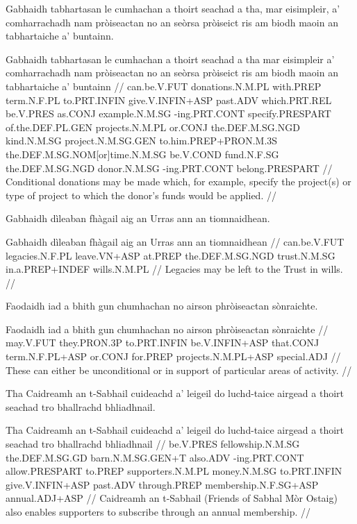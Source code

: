\documentclass[a4paper,10pt]{article}
\begin{document}
\ex
\begingl
\glpre Gabhaidh tabhartasan le cumhachan a thoirt seachad a tha, mar eisimpleir, a' comharrachadh nam pròiseactan no an seòrsa pròiseict ris am biodh maoin an tabhartaiche a' buntainn. 

\vspace{4mm}
\gla Gabhaidh tabhartasan le cumhachan a thoirt seachad a tha mar eisimpleir a' comharrachadh nam pròiseactan no an seòrsa pròiseict ris am biodh maoin an tabhartaiche a' buntainn  //
\glb can.be.V.FUT donations.N.M.PL with.PREP term.N.F.PL to.PRT.INFIN give.V.INFIN+ASP past.ADV which.PRT.REL be.V.PRES as.CONJ example.N.M.SG -ing.PRT.CONT specify.PRESPART of.the.DEF.PL.GEN projects.N.M.PL or.CONJ the.DEF.M.SG.NGD kind.N.M.SG project.N.M.SG.GEN to.him.PREP+PRON.M.3S the.DEF.M.SG.NOM[or]time.N.M.SG be.V.COND fund.N.F.SG the.DEF.M.SG.NGD donor.N.M.SG -ing.PRT.CONT belong.PRESPART  //
\glft Conditional donations may be made which, for example, specify the project(s) or type of project to which the donor's funds would be applied. //
\endgl
\xe

\ex
\begingl
\glpre Gabhaidh dìleaban fhàgail aig an Urras ann an tiomnaidhean. 

\vspace{4mm}
\gla Gabhaidh dìleaban fhàgail aig an Urras {ann an} tiomnaidhean  //
\glb can.be.V.FUT legacies.N.F.PL leave.VN+ASP at.PREP the.DEF.M.SG.NGD trust.N.M.SG in.a.PREP+INDEF wills.N.M.PL  //
\glft Legacies may be left to the Trust in wills. //
\endgl
\xe

\ex
\begingl
\glpre Faodaidh iad a bhith gun chumhachan no airson phròiseactan sònraichte. 

\vspace{4mm}
\gla Faodaidh iad a bhith gun chumhachan no airson phròiseactan sònraichte  //
\glb may.V.FUT they.PRON.3P to.PRT.INFIN be.V.INFIN+ASP that.CONJ term.N.F.PL+ASP or.CONJ for.PREP projects.N.M.PL+ASP special.ADJ  //
\glft These can either be unconditional or in support of particular areas of activity. //
\endgl
\xe

\ex
\begingl
\glpre Tha Caidreamh an t-Sabhail cuideachd a' leigeil do luchd-taice airgead a thoirt seachad tro bhallrachd bhliadhnail. 

\vspace{4mm}
\gla Tha Caidreamh an t-Sabhail cuideachd a' leigeil do luchd-taice airgead a thoirt seachad tro bhallrachd bhliadhnail  //
\glb be.V.PRES fellowship.N.M.SG the.DEF.M.SG.GD barn.N.M.SG.GEN+T also.ADV -ing.PRT.CONT allow.PRESPART to.PREP supporters.N.M.PL money.N.M.SG to.PRT.INFIN give.V.INFIN+ASP past.ADV through.PREP membership.N.F.SG+ASP annual.ADJ+ASP  //
\glft Caidreamh an t-Sabhail (Friends of Sabhal Mòr Ostaig) also enables supporters to subscribe through an annual membership. //
\endgl
\xe
\end{document}
